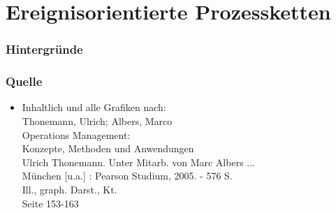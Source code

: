 \documentclass{beamer}
\begin{document}
 \section[Ereignisorientierte Prozessketten]{Ereignisorientierte Prozessketten}
 \begin{frame}
  \frametitle{Hintergründe}

 \end{frame}


 \begin{frame}
  \frametitle{Quelle}
   \begin{itemize}
    \item Inhaltlich und alle Grafiken nach:\\
      Thonemann, Ulrich; Albers, Marco\\
      Operations Management:\\
      Konzepte, Methoden und Anwendungen\\
      Ulrich Thonemann. Unter Mitarb. von Marc Albers ... \\
      München [u.a.] : Pearson Studium, 2005. - 576 S.\\
      Ill., graph. Darst., Kt.\\
      Seite 153-163
   \end{itemize}
 \end{frame}
\end{document}
